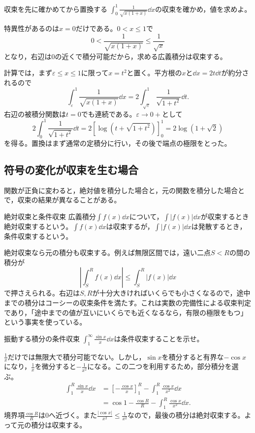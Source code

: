 \begin{example}{収束を先に確かめてから置換する}
$\int_0^1\frac1{\sqrt{x(1+x)}}\dd x$の収束を確かめ，値を求めよ。
\end{example}

特異性があるのは$x=0$だけである。$0<x\leq1$で
\[
 0<\frac1{\sqrt{x(1+x)}}\leq\frac1{\sqrt{x}}
\]
となり，右辺は$0$の近くで積分可能だから，求める広義積分は収束する。

計算では，まず$\varepsilon\leq x\leq1$に限って$x=t^2$と置く。平方根の$x$と$\dd x=2t\dd t$が約分されるので
\[
 \int_{\varepsilon}^1\frac1{\sqrt{x(1+x)}}\dd x
 =2\int_{\sqrt{\varepsilon}}^1\frac1{\sqrt{1+t^2}}\dd t.
\]
右辺の被積分関数は$t=0$でも連続である。$\varepsilon\to0+$として
\[
 2\int_0^1\frac1{\sqrt{1+t^2}}\dd t
 =2\left[\log\left(t+\sqrt{1+t^2}\right)\right]_0^1
 =2\log(1+\sqrt2)
\]
を得る。置換はまず通常の定積分に行い，その後で端点の極限をとった。

\subsection{符号の変化が収束を生む場合}

関数が正負に変わると，絶対値を積分した場合と，元の関数を積分した場合とで，収束の結果が異なることがある。

\begin{definition}{絶対収束と条件収束}
広義積分$\int f(x)\dd x$について，$\int|f(x)|\dd x$が収束するとき絶対収束するという。$\int f(x)\dd x$は収束するが，$\int|f(x)|\dd x$は発散するとき，条件収束するという。
\end{definition}

絶対収束なら元の積分も収束する。例えば無限区間では，遠い二点$S<R$の間の積分が
\[
 \left|\int_S^Rf(x)\dd x\right|\leq\int_S^R|f(x)|\dd x
\]
で押さえられる。右辺は$S,R$が十分大きければいくらでも小さくなるので，途中までの積分はコーシーの収束条件を満たす。これは実数の完備性による収束判定であり，「途中までの値が互いにいくらでも近くなるなら，有限の極限をもつ」という事実を使っている。

\begin{example}{振動する積分の条件収束}
$\int_1^{\infty}\frac{\sin x}{x}\dd x$は条件収束することを示せ。
\end{example}

$\frac1x$だけでは無限大で積分可能でない。しかし，$\sin x$を積分すると有界な$-\cos x$になり，$\frac1x$を微分すると$-\frac1{x^2}$になる。この二つを利用するため，部分積分を選ぶ。
\[
\begin{aligned}
 \int_1^R\frac{\sin x}{x}\dd x
 &=\left[-\frac{\cos x}{x}\right]_1^R
   -\int_1^R\frac{\cos x}{x^2}\dd x\\
 &=\cos1-\frac{\cos R}{R}-\int_1^R\frac{\cos x}{x^2}\dd x.
\end{aligned}
\]
境界項$\frac{\cos R}{R}$は$0$へ近づく。また$\frac{|\cos x|}{x^2}\leq\frac1{x^2}$なので，最後の積分は絶対収束する。よって元の積分は収束する。

